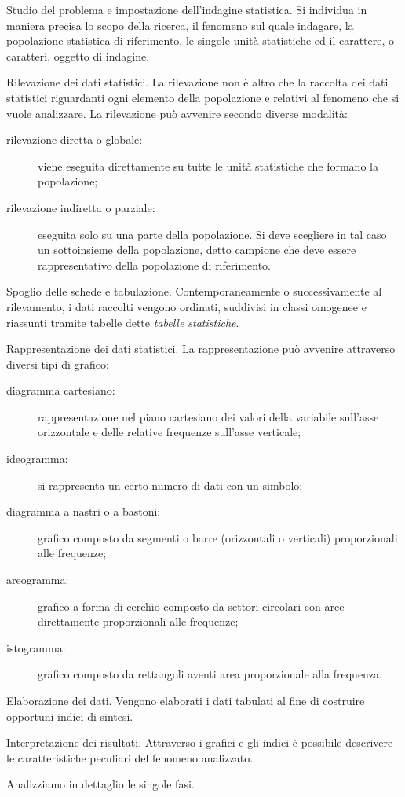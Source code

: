 \begin{enumeratea}
\item Studio del problema e impostazione dell'indagine statistica.
Si individua in maniera precisa lo scopo della ricerca, il fenomeno sul quale indagare, la popolazione statistica di riferimento,
le singole unità statistiche ed il carattere, o caratteri, oggetto di indagine.
\item Rilevazione dei dati statistici.
La rilevazione non è altro che la raccolta dei dati statistici riguardanti ogni elemento della popolazione e relativi al fenomeno che si vuole analizzare.
La rilevazione può avvenire secondo diverse modalità:
\begin{description}
\item [rilevazione diretta o globale:] viene eseguita direttamente su tutte le unità statistiche che formano la popolazione;
\item [rilevazione indiretta o parziale:] eseguita solo su una parte della popolazione. Si deve scegliere in tal caso un sottoinsieme della popolazione,
detto campione che deve essere rappresentativo della popolazione di riferimento.
\end{description}
\item Spoglio delle schede e tabulazione.
Contemporaneamente o successivamente al rilevamento, i dati raccolti vengono ordinati, suddivisi in classi omogenee e riassunti tramite tabelle dette \emph{tabelle statistiche}.
\item Rappresentazione dei dati statistici.
La rappresentazione può avvenire attraverso diversi tipi di grafico:
\begin{description}
\item [diagramma cartesiano:] rappresentazione nel piano cartesiano dei valori della variabile sull'asse orizzontale e delle relative frequenze sull'asse verticale;
\item [ideogramma:]si rappresenta un certo numero di dati con un simbolo;
\item [diagramma a nastri o a bastoni:]grafico composto da segmenti o barre (orizzontali o verticali) proporzionali alle frequenze;
\item [areogramma:]grafico a forma di cerchio composto da settori circolari con aree direttamente proporzionali alle frequenze;
\item [istogramma:] grafico composto da rettangoli aventi area proporzionale alla frequenza.
\end{description}
\item Elaborazione dei dati.
Vengono elaborati i dati tabulati al fine di costruire opportuni indici di sintesi.
\item Interpretazione dei risultati.
Attraverso i grafici e gli indici è possibile descrivere le caratteristiche peculiari del fenomeno analizzato.
\end{enumeratea}
Analizziamo in dettaglio le singole fasi.

